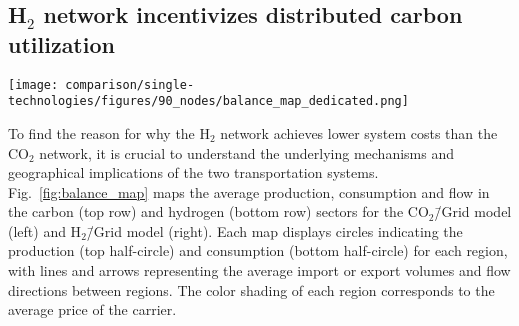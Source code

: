 \documentclass[twocolumn]{article}
\newcommand{\COtwo}{CO$_2$}
\newcommand{\Htwo}{H$_2$}
\newcommand{\modCO}{CO$_2$\=/Grid model}
\newcommand{\modH}{H$_2$\=/Grid model}
\begin{document}



\subsection*{\Htwo{} network incentivizes distributed carbon utilization}\label{subsec:H2}

\begin{figure*}[ht!]
    \centering
    \texttt{[image: comparison/single-technologies/figures/90\_nodes/balance\_map\_dedicated.png]}
    \caption{Optimal operation per sector for a net-zero energy system in Europe with average production on the left and average consumption on the right for both, (a) the \COtwo{} sector in the \modCO{} and (b) the \Htwo{} sector in the \modH{}.}
    \label{fig:balance_map}
\end{figure*}

To find the reason for why the \Htwo{} network achieves lower system costs than the \COtwo{} network, it is crucial to understand the underlying mechanisms and geographical implications of the two transportation systems. Fig.~\ref{fig:balance_map} maps the average production, consumption and flow in the carbon (top row) and hydrogen (bottom row) sectors for the \modCO{} (left) and \modH{} (right). Each map displays circles indicating the production (top half-circle) and consumption (bottom half-circle) for each region, with lines and arrows representing the average import or export volumes and flow directions between regions. The color shading of each region corresponds to the average price of the carrier.
\end{document}
